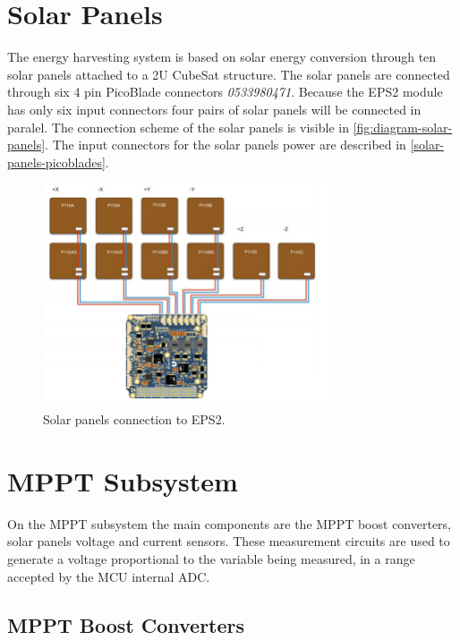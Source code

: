 \section{Solar Panels}

The energy harvesting system is based on solar energy conversion through ten solar panels attached to a 2U CubeSat structure. The solar panels are connected through six 4 pin PicoBlade connectors \textit{0533980471}. Because the EPS2 module has only six input connectors four pairs of solar panels will be connected in paralel. The connection scheme of the solar panels is visible in \autoref{fig:diagram-solar-panels}. The input connectors for the solar panels power are described in \autoref{solar-panels-picoblades}.
\begin{figure}[!ht]
    \begin{center}
        \includegraphics[width=0.75\textwidth]{figures/diagram-solar-panels.png}
        \caption{Solar panels connection to EPS2.}
        \label{fig:diagram-solar-panels}
    \end{center}
\end{figure}

\section{MPPT Subsystem}

On the MPPT subsystem the main components are the MPPT boost converters, solar panels voltage and current sensors. These measurement circuits are used to generate a voltage proportional to the variable being measured, in a range accepted by the MCU internal ADC.

\subsection{MPPT Boost Converters}

